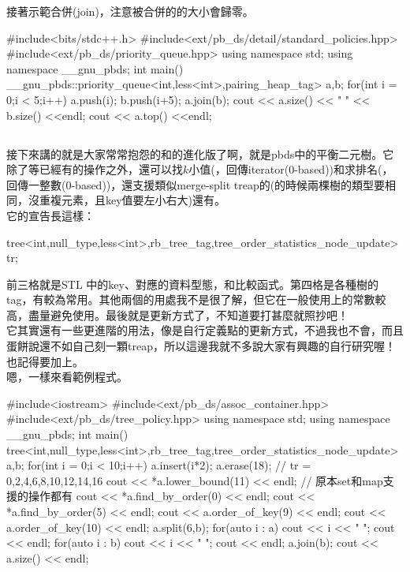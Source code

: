 \documentclass[main.tex]{subfiles}
\begin{document}
接著示範合併(join)，注意被合併的的大小會歸零。\\
\begin{C++}
#include<bits/stdc++.h>
#include<ext/pb_ds/detail/standard_policies.hpp>
#include<ext/pb_ds/priority_queue.hpp>
using namespace std;
using namespace __gnu_pbds;
int main()
{
  __gnu_pbds::priority_queue<int,less<int>,pairing_heap_tag> a,b;
  for(int i = 0;i < 5;i++)
  {
    a.push(i);
    b.push(i+5);
  }
  a.join(b);
  cout << a.size() << " " << b.size() <<endl;
  cout << a.top() <<endl;
}

\end{C++}
\subsection{}
接下來講的就是大家常常抱怨的和的進化版了啊，就是pbds中的平衡二元樹。它除了等已經有的操作之外，還可以找$k$小值(，回傳iterator(0-based))和求排名(，回傳一整數(0-based))，還支援類似merge-split treap的(的時候兩棵樹的類型要相同，沒重複元素，且key值要左小右大)還有。\\
它的宣告長這樣：\\
\begin{C++}
tree<int,null_type,less<int>,rb_tree_tag,tree_order_statistics_node_update> tr;
\end{C++}

前三格就是STL 中的key、對應的資料型態，和比較函式。第四格是各種樹的tag，有較為常用。其他兩個的用處我不是很了解，但它在一般使用上的常數較高，盡量避免使用。最後就是更新方式了，不知道要打甚麼就照抄吧！\\
它其實還有一些更進階的用法，像是自行定義點的更新方式，不過我也不會，而且蛋餅說還不如自己刻一顆treap，所以這邊我就不多說大家有興趣的自行研究喔！
也記得要加上。\\
嗯，一樣來看範例程式。\\
\begin{C++}
#include<iostream>
#include<ext/pb_ds/assoc_container.hpp>
#include<ext/pb_ds/tree_policy.hpp>
using namespace std;
using namespace __gnu_pbds;
int main()
{
  tree<int,null_type,less<int>,rb_tree_tag,tree_order_statistics_node_update> a,b;
  for(int i = 0;i < 10;i++)
  {
    a.insert(i*2);
  }
  a.erase(18); // tr = {0,2,4,6,8,10,12,14,16}
  cout << *a.lower_bound(11) << endl; // 原本set和map支援的操作都有
  cout << *a.find_by_order(0) << endl; 
  cout << *a.find_by_order(5) << endl;
  cout << a.order_of_key(9) << endl;
  cout << a.order_of_key(10) << endl;
  a.split(6,b);
  for(auto i : a)
  {
    cout << i << " ";
  }
  cout << endl;
  for(auto i : b)
  {
    cout << i << " ";
  }
  cout << endl;
  a.join(b);
  cout << a.size() << endl;
}
\end{C++}
\end{document}
